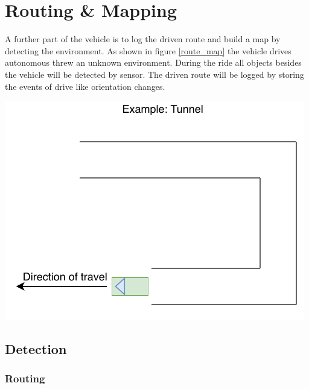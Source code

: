 \newpage

\section{Routing \& Mapping}

A further part of the vehicle is to log the driven route and build a map by detecting the environment.
As shown in figure \ref{route_map} the vehicle drives autonomous threw an unknown environment. During the
ride all objects besides the vehicle will be detected by sensor. The driven route will be logged by
storing the events of drive like orientation changes.\\
\begin{center}
\begin{minipage}{0.45\textwidth}
\label{route_map}
\includegraphics[page=3,scale=1]{sources/mapping/example_tunnel.pdf}
\end{minipage}
\end{center}

\subsection{Detection}

\subsubsection{Routing}

